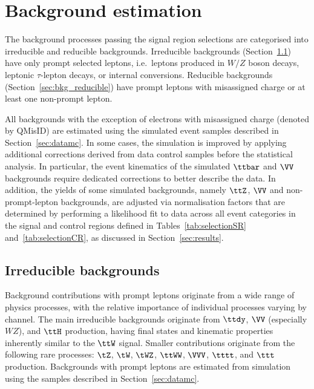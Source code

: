 \documentclass[cernpreprint, atlasdraft=false, texlive=2023, UKenglish, texmf, orcidlogo]{atlasdoc}
\begin{document}
 


 
\section{Background estimation}
\label{sec:background}

 
The background processes passing the signal region selections are categorised into irreducible and reducible backgrounds.
Irreducible backgrounds  (Section~\ref{sec:bkg_irreducible}) have only prompt selected leptons, i.e.\ leptons produced in $W/Z$ boson decays, leptonic $\tau$-lepton decays, or internal conversions. Reducible backgrounds (Section~\ref{sec:bkg_reducible}) have prompt leptons with misassigned charge or at least one non-prompt lepton.
 
All backgrounds with the exception of electrons with misassigned charge (denoted by QMisID) are estimated using the simulated event samples described in Section~\ref{sec:datamc}. In some cases, the simulation is improved by applying additional corrections derived from data control samples before the statistical analysis. In particular, the event kinematics of the simulated $\ttbar$ and $\VV$ backgrounds require dedicated corrections to better describe the data. In addition, the yields of some simulated backgrounds, namely $\ttZ$, $\VV$ and non-prompt-lepton backgrounds, are adjusted via normalisation factors that are determined by performing a likelihood fit to data across all event categories in the signal and control regions defined in Tables~\ref{tab:selectionSR} and~\ref{tab:selectionCR}, as discussed in Section~\ref{sec:results}.
 
\subsection{Irreducible backgrounds}
\label{sec:bkg_irreducible}
 
Background contributions with prompt leptons originate from a wide range of physics processes, with the relative importance of individual processes varying by channel. The main irreducible backgrounds originate from $\ttdy$, $\VV$ (especially $WZ$), and $\ttH$ production, having final states and kinematic properties inherently similar to the $\ttW$ signal. Smaller contributions originate from the following rare processes: $\tZ$, $\tW$, $\tWZ$, $\ttWW$, $\VVV$, $\tttt$, and $\ttt$ production. Backgrounds with prompt leptons are estimated from simulation using the samples described in Section~\ref{sec:datamc}.
 
\end{document}
